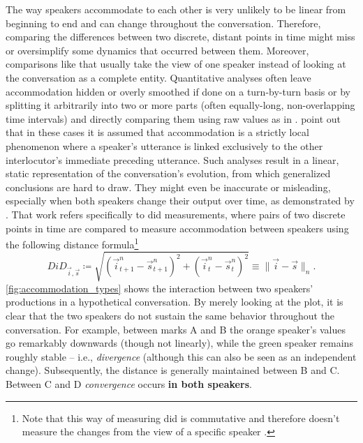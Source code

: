 The way speakers accommodate to each other is very unlikely to be linear from beginning to end and can change throughout the conversation.
Therefore, comparing the differences between two discrete, distant points in time might miss or oversimplify some dynamics that occurred between them.
Moreover, comparisons like that usually take the view of one speaker instead of looking at the conversation as a complete entity.
Quantitative analyses often leave accommodation hidden or overly smoothed if done on a turn-by-turn basis or by splitting it arbitrarily into two or more parts (often equally-long, non-overlapping time intervals) and directly comparing them using raw values as in \citet{Heldner2010pitch, Rahimi2018weighting, Ibrahim2019fundamental}.
\citet[][p.~15]{DeLooze2014investigating} point out that in these cases it is assumed that accommodation is a strictly local phenomenon where a speaker's utterance is linked exclusively to the other interlocutor's immediate preceding utterance.
Such analyses result in a linear, static representation of the conversation's evolution, from which generalized conclusions are hard to draw.
They might even be inaccurate or misleading, especially when both speakers change their output over time, as demonstrated by \citet{CohenPriva2019limitations}.
That work refers specifically to \ac{did} measurements, where pairs of two discrete points in time are compared to measure accommodation between speakers using the following distance formula\footnote{Note that this way of measuring \ac{did} is commutative and therefore doesn't measure the changes from the view of a specific speaker \citep[unlike,~e.g.,][p.~3]{CohenPriva2019limitations}.}
%
\begin{equation}
	\label{eq:did}
	DiD_{\vec{i},\vec{s}} \coloneqq \sqrt{(\vec{i}_{t + 1}^n - \vec{s}_{t + 1}^n)^2 + (\vec{i}_t^n - \vec{s}_t^n)^2} \equiv \lVert \vec{i} - \vec{s} \rVert_n.
\end{equation}
\noindent
%
\cref{fig:accommodation_types} shows the interaction between two speakers' productions in a hypothetical conversation.
By merely looking at the plot, it is clear that the two speakers do not sustain the same behavior throughout the conversation.
For example, between marks A and B the orange speaker's values go remarkably downwards (though not linearly), while the green speaker remains roughly stable -- i.e., \emph{divergence} (although this can also be seen as an independent change).
Subsequently, the distance is generally maintained between B and C.
Between C and D \emph{convergence} occurs \textbf{in both speakers}.
